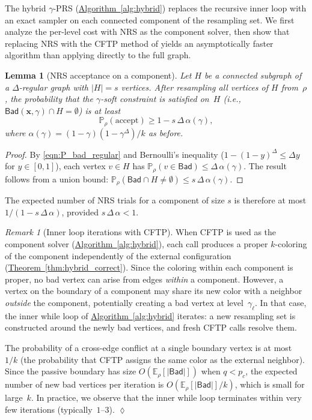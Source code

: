 \documentclass[12pt, a4paper]{article}
\theoremstyle{plain}
\newtheorem{lemma}{Lemma}
\theoremstyle{definition}
\theoremstyle{remark}
\newtheorem{remark}{Remark}
\newcommand{\mbb}{\mathbb}
\renewcommand{\v}[1]{\boldsymbol{#1}}
\newcommand{\mx}{\v{x}}
\newcommand{\sref}[2]{\hyperref[#2]{#1~\ref*{#2}}}
\newcommand{\bad}{\mathsf{Bad}}
\begin{document}
The hybrid \(\gamma\)-PRS (\sref{Algorithm}{alg:hybrid}) replaces the recursive inner loop with an exact sampler on each connected component of the resampling set. We first analyze the per-level cost with NRS as the component solver, then show that replacing NRS with the CFTP method of \cite{BC20} yields an asymptotically faster algorithm than applying \cite{BC20} directly to the full graph.

\begin{lemma}[NRS acceptance on a component]\label{lem:nrs-accept}
Let \(H\) be a connected subgraph of a \(\Delta\)-regular graph with \(|H|=s\) vertices. After resampling all vertices of \(H\) from~\(\rho\), the probability that the \(\gamma\)-soft constraint is satisfied on~\(H\) (i.e., \(\bad(\mx,\gamma)\cap H=\emptyset\)) is at least
\[
\mbb P_\rho(\text{accept}) \geq 1 - s\,\Delta\,\alpha(\gamma),
\]
where \(\alpha(\gamma) = (1-\gamma)(1-\gamma^\Delta)/k\) as before.
\end{lemma}
\begin{proof}
By \eqref{eqn:P_bad_regular} and Bernoulli's inequality (\(1-(1-y)^\Delta\leq\Delta y\) for \(y\in[0,1]\)), each vertex \(v\in H\) has \(\mbb P_\rho(v\in\bad)\leq\Delta\,\alpha(\gamma)\). The result follows from a union bound: \(\mbb P_\rho(\bad\cap H\neq\emptyset)\leq s\,\Delta\,\alpha(\gamma)\).
\end{proof}

The expected number of NRS trials for a component of size \(s\) is therefore at most \(1/(1-s\,\Delta\,\alpha)\), provided \(s\,\Delta\,\alpha < 1\).

\begin{remark}[Inner loop iterations with CFTP]\normalfont\label{rem:cftp-iterations}
When CFTP is used as the component solver (\sref{Algorithm}{alg:hybrid}), each call produces a proper \(k\)-coloring of the component independently of the external configuration (\sref{Theorem}{thm:hybrid_correct}). Since the coloring within each component is proper, no bad vertex can arise from edges {\em within} a component. However, a vertex on the boundary of a component may share its new color with a neighbor {\em outside} the component, potentially creating a bad vertex at level~\(\gamma_\ell\). In that case, the inner while loop of \sref{Algorithm}{alg:hybrid} iterates: a new resampling set is constructed around the newly bad vertices, and fresh CFTP calls resolve them.

The probability of a cross-edge conflict at a single boundary vertex is at most~\(1/k\) (the probability that CFTP assigns the same color as the external neighbor). Since the passive boundary has size \(O(\mbb E_\rho[|\bad|])\) when \(q < p_c\), the expected number of new bad vertices per iteration is \(O(\mbb E_\rho[|\bad|]/k)\), which is small for large~\(k\). In practice, we observe that the inner while loop terminates within very few iterations (typically~\(1\)--\(3\)).
\hfill\(\lozenge\)
\end{remark}
\end{document}
